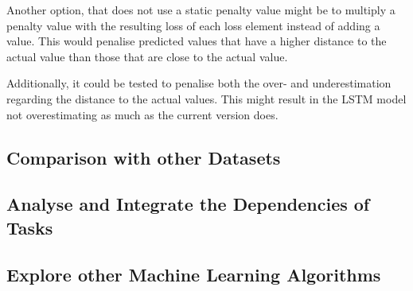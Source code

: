             Another option, that does not use a static penalty value might be to multiply a penalty value with the resulting loss of each loss element instead of adding a value. This would penalise predicted values that have a higher distance to the actual value than those that are close to the actual value.
            
            Additionally, it could be tested to penalise both the over- and underestimation regarding the distance to the actual values.
            This might result in the LSTM model not overestimating as much as the current version does.
        \subsection{Comparison with other Datasets}
        \label{sec:comparison-with-other-datasets-future-work}


        \subsection{Analyse and Integrate the Dependencies of Tasks}
        \label{sec:analyse-and-integrate-the-dependencies-of-tasks-future-work}


        \subsection{Explore other Machine Learning Algorithms}
        \label{sec:explore-other-machine-learning-algorithms-future-work}



